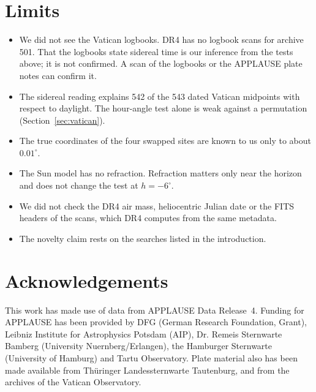 \documentclass[11pt]{article}
\begin{document}
\section{Limits}
\begin{itemize}
\item We did not see the Vatican logbooks. DR4 has no logbook scans for archive 501. That the logbooks state sidereal time is our inference from the tests above; it is not confirmed. A scan of the logbooks or the APPLAUSE plate notes can confirm it.
\item The sidereal reading explains 542 of the 543 dated Vatican midpoints with respect to daylight. The hour-angle test alone is weak against a permutation (Section~\ref{sec:vatican}).
\item The true coordinates of the four swapped sites are known to us only to about $0.01^\circ$.
\item The Sun model has no refraction. Refraction matters only near the horizon and does not change the test at $h=-6^\circ$.
\item We did not check the DR4 air mass, heliocentric Julian date or the FITS headers of the scans, which DR4 computes from the same metadata.
\item The novelty claim rests on the searches listed in the introduction.
\end{itemize}

\section*{Acknowledgements}
This work has made use of data from APPLAUSE Data Release~4. Funding for APPLAUSE has been provided by DFG (German Research Foundation, Grant), Leibniz Institute for Astrophysics Potsdam (AIP), Dr. Remeis Sternwarte Bamberg (University Nuernberg/Erlangen), the Hamburger Sternwarte (University of Hamburg) and Tartu Observatory. Plate material also has been made available from Th\"uringer Landessternwarte Tautenburg, and from the archives of the Vatican Observatory.
\end{document}
